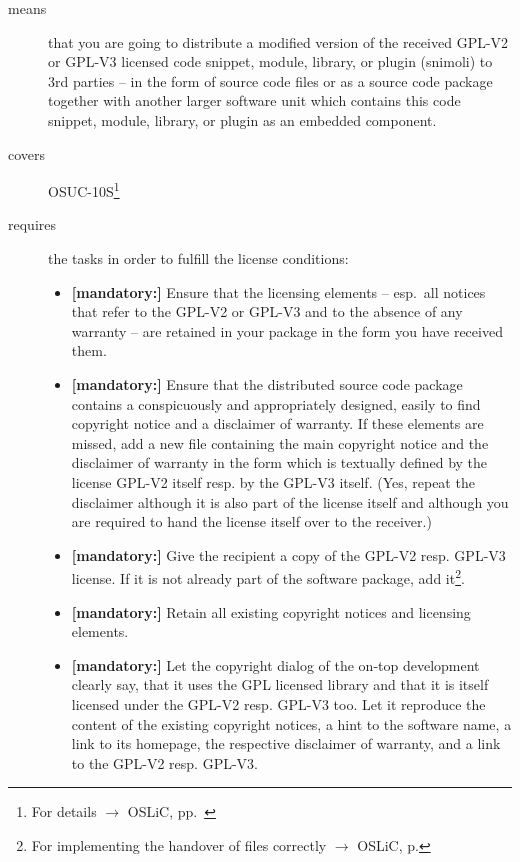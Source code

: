 \begin{description}
\item[means] that you are going to distribute a modified version of the received
GPL-V2 or GPL-V3 licensed code snippet, module, library, or plugin (snimoli) to
3rd parties -- in the form of source code files or as a source code package
together with another larger software unit which contains this code snippet,
module, library, or plugin as an embedded component.
\item[covers] OSUC-10S\footnote{For details $\rightarrow$ OSLiC, pp.\
\pageref{OSUC-10S-DEF}}
\item[requires] the tasks in order to fulfill the license conditions:
\begin{itemize}


  \item \textbf{[mandatory:]} Ensure that the licensing elements -- esp.\ all
  notices that refer to the GPL-V2 or GPL-V3 and to the absence of any
  warranty -- are retained in your package in the form you have received them.

  \item \textbf{[mandatory:]} Ensure that the distributed source code package
  contains a conspicuously and appropriately designed, easily to find copyright
  notice and a disclaimer of warranty. If these elements are missed, add a new
  file containing the main copyright notice and the disclaimer of warranty in
  the form which is textually defined by the license GPL-V2 itself resp. by the
  GPL-V3 itself. (Yes, repeat the disclaimer although it is also part of the
  license itself and although you are required to hand the license itself over
  to the receiver.)
  
  \item \textbf{[mandatory:]} Give the recipient a copy of the GPL-V2 resp.
  GPL-V3 license. If it is not already part of the software package, add
  it\footnote{For implementing the handover of files correctly $\rightarrow$
  OSLiC, p. \pageref{DistributingFilesHint}}.
  
  \item \textbf{[mandatory:]} Retain all existing copyright notices and
  licensing elements.
  
  \item \textbf{[mandatory:]} Let the copyright dialog of the on-top development
  clearly say, that it uses the GPL licensed library and that it is itself
  licensed under the GPL-V2 resp. GPL-V3 too. Let it reproduce the content of
  the existing copyright notices, a hint to the software name, a link to its
  homepage, the respective disclaimer of warranty, and a link to the GPL-V2
  resp. GPL-V3.
    

\end{itemize}
\end{description}
